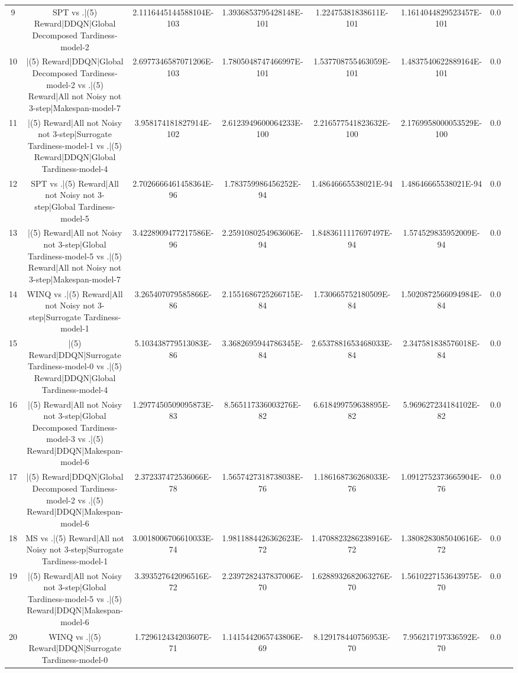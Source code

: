 \documentclass[a3paper,10pt]{article}
\begin{document}
\begin{table}[!htp]
\begin{tabular}{cccccccc}
9&SPT vs .|(5) Reward|DDQN|Global Decomposed Tardiness-model-2&2.1116445144588104E-103&1.3936853795428148E-101&1.22475381838611E-101&1.1614044829523457E-101&0.0\\
10&|(5) Reward|DDQN|Global Decomposed Tardiness-model-2 vs .|(5) Reward|All not Noisy not 3-step|Makespan-model-7&2.6977346587071206E-103&1.7805048747466997E-101&1.537708755463059E-101&1.4837540622889164E-101&0.0\\
11&|(5) Reward|All not Noisy not 3-step|Surrogate Tardiness-model-1 vs .|(5) Reward|DDQN|Global Tardiness-model-4&3.958174181827914E-102&2.6123949600064233E-100&2.216577541823632E-100&2.1769958000053529E-100&0.0\\
12&SPT vs .|(5) Reward|All not Noisy not 3-step|Global Tardiness-model-5&2.7026666461458364E-96&1.783759986456252E-94&1.48646665538021E-94&1.48646665538021E-94&0.0\\
13&|(5) Reward|All not Noisy not 3-step|Global Tardiness-model-5 vs .|(5) Reward|All not Noisy not 3-step|Makespan-model-7&3.4228909477217586E-96&2.2591080254963606E-94&1.8483611117697497E-94&1.574529835952009E-94&0.0\\
14&WINQ vs .|(5) Reward|All not Noisy not 3-step|Surrogate Tardiness-model-1&3.265407079585866E-86&2.1551686725266715E-84&1.730665752180509E-84&1.5020872566094984E-84&0.0\\
15&|(5) Reward|DDQN|Surrogate Tardiness-model-0 vs .|(5) Reward|DDQN|Global Tardiness-model-4&5.103438779513083E-86&3.3682695944786345E-84&2.6537881653468033E-84&2.347581838576018E-84&0.0\\
16&|(5) Reward|All not Noisy not 3-step|Global Decomposed Tardiness-model-3 vs .|(5) Reward|DDQN|Makespan-model-6&1.2977450509095873E-83&8.565117336003276E-82&6.618499759638895E-82&5.969627234184102E-82&0.0\\
17&|(5) Reward|DDQN|Global Decomposed Tardiness-model-2 vs .|(5) Reward|DDQN|Makespan-model-6&2.372337472536066E-78&1.5657427318738038E-76&1.186168736268033E-76&1.0912752373665904E-76&0.0\\
18&MS vs .|(5) Reward|All not Noisy not 3-step|Surrogate Tardiness-model-1&3.0018006706610033E-74&1.9811884426362623E-72&1.4708823286238916E-72&1.3808283085040616E-72&0.0\\
19&|(5) Reward|All not Noisy not 3-step|Global Tardiness-model-5 vs .|(5) Reward|DDQN|Makespan-model-6&3.393527642096516E-72&2.2397282437837006E-70&1.6288932682063276E-70&1.5610227153643975E-70&0.0\\
20&WINQ vs .|(5) Reward|DDQN|Surrogate Tardiness-model-0&1.729612434203607E-71&1.1415442065743806E-69&8.129178440756953E-70&7.956217197336592E-70&0.0\\

\end{tabular}
\end{table}
\end{document}

